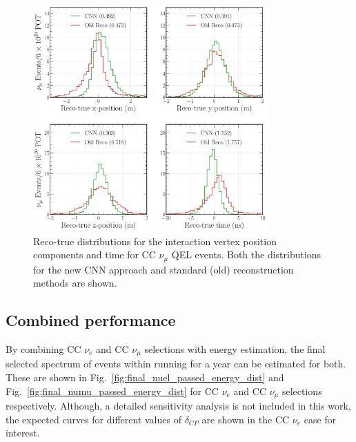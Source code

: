 \begin{figure} %
    \includegraphics[width=0.8\textwidth]{diagrams/7-results/final_vertex_numu_res_comparison.pdf}
    \caption[Reco-true distributions for the interaction vertex parameters for CC $\nu_{\mu}$ QEL
        events] {Reco-true distributions for the interaction vertex position components and time
        for CC $\nu_{\mu}$ QEL events. Both the distributions for the new CNN approach and
        standard (old) reconstruction methods are shown.}
    \label{fig:final_vertex_numu_res_comparison}
\end{figure}

\subsection{Combined performance} %
\label{sec:results_eval_combined} %

By combining CC $\nu_{e}$ and CC $\nu_{\mu}$ selections with energy estimation, the final selected
spectrum of events within \chipsfive running for a year can be estimated for both. These are shown
in Fig.~\ref{fig:final_nuel_passed_energy_dist} and Fig.~\ref{fig:final_numu_passed_energy_dist}
for CC $\nu_{e}$ and CC $\nu_{\mu}$ selections respectively. Although, a detailed \chipsfive
sensitivity analysis is not included in this work, the expected curves for different values of
$\delta_{CP}$ are shown in the CC $\nu_{e}$ case for interest.

